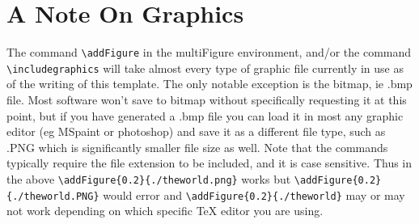 \begin{multiFigure}
\end{multiFigure}

\section{A Note On Graphics}
The command \verb|\addFigure| in the multiFigure environment, and/or the command \verb|\includegraphics| will take almost every type of graphic file currently in use as of the writing of this template. The only notable exception is the bitmap, ie .bmp file. Most software won't save to bitmap without specifically requesting it at this point, but if you have generated a .bmp file you can load it in most any graphic editor (eg MSpaint or photoshop) and save it as a different file type, such as .PNG which is significantly smaller file size as well. Note that the commands typically require the file extension to be included, and it is case sensitive. Thus in the above \verb|\addFigure{0.2}{./theworld.png}| works but \verb|\addFigure{0.2}{./theworld.PNG}| would error and \verb|\addFigure{0.2}{./theworld}| may or may not work depending on which specific TeX editor you are using.

